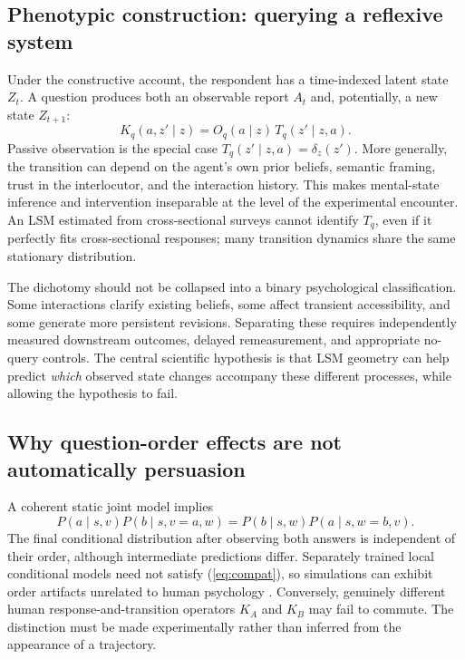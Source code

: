 \documentclass[journal,10pt]{IEEEtran}
\begin{document}
\subsection{Phenotypic construction: querying a reflexive system}
Under the constructive account, the respondent has a time-indexed latent state $Z_t$. A question produces both an observable report $A_t$ and, potentially, a new state $Z_{t+1}$:
\begin{equation}
K_q(a,z'\mid z)=O_q(a\mid z)\,T_q(z'\mid z,a).
\label{eq:kernel}
\end{equation}
Passive observation is the special case $T_q(z'\mid z,a)=\delta_z(z')$. More generally, the transition can depend on the agent's own prior beliefs, semantic framing, trust in the interlocutor, and the interaction history. This makes mental-state inference and intervention inseparable at the level of the experimental encounter. An LSM estimated from cross-sectional surveys cannot identify $T_q$, even if it perfectly fits cross-sectional responses; many transition dynamics share the same stationary distribution.

The dichotomy should not be collapsed into a binary psychological classification. Some interactions clarify existing beliefs, some affect transient accessibility, and some generate more persistent revisions. Separating these requires independently measured downstream outcomes, delayed remeasurement, and appropriate no-query controls. The central scientific hypothesis is that LSM geometry can help predict \emph{which} observed state changes accompany these different processes, while allowing the hypothesis to fail.

\subsection{Why question-order effects are not automatically persuasion}
A coherent static joint model implies
\begin{equation}
P(a\mid s,v)P(b\mid s,v=a,w)
=P(b\mid s,w)P(a\mid s,w=b,v).
\label{eq:compat}
\end{equation}
The final conditional distribution after observing both answers is independent of their order, although intermediate predictions differ. Separately trained local conditional models need not satisfy (\ref{eq:compat}), so simulations can exhibit order artifacts unrelated to human psychology \cite{heckerman2000}. Conversely, genuinely different human response-and-transition operators $K_A$ and $K_B$ may fail to commute. The distinction must be made experimentally rather than inferred from the appearance of a trajectory.
\end{document}
